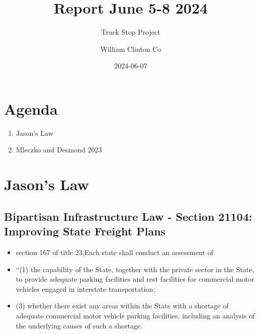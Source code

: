 \documentclass[
  letterpaper,
  DIV=11,
  numbers=noendperiod]{scrartcl}
\title{Report June 5-8 2024}
\subtitle{Truck Stop Project}
\author{William Clinton Co}
\date{2024-06-07}
\begin{document}
\maketitle
\ifdefined\Shaded\renewenvironment{Shaded}{\begin{tcolorbox}[sharp corners, interior hidden, enhanced, frame hidden, borderline west={3pt}{0pt}{shadecolor}, boxrule=0pt, breakable]}{\end{tcolorbox}}\fi

\hypertarget{agenda}{%
\section{Agenda}\label{agenda}}

\begin{enumerate}
\def\labelenumi{\arabic{enumi}.}
\item
  Jason's Law
\item
  Mleczko and Desmond 2023
\end{enumerate}

\hypertarget{jasons-law}{%
\section{Jason's Law}\label{jasons-law}}

\hypertarget{bipartisan-infrastructure-law---section-21104-improving-state-freight-plans}{%
\subsection{\texorpdfstring{\textbf{Bipartisan Infrastructure Law -
Section 21104: Improving State Freight
Plans}}{Bipartisan Infrastructure Law - Section 21104: Improving State Freight Plans}}\label{bipartisan-infrastructure-law---section-21104-improving-state-freight-plans}}

\begin{itemize}
\item
  section 167 of title 23,Each state shall conduct an assessment of
\item
  ``(1) the capability of the State, together with the private sector in
  the State, to provide adequate parking facilities and rest facilities
  for commercial motor vehicles engaged in interstate transportation;
\item
  (3) whether there exist any areas within the State with a shortage of
  adequate commercial motor vehicle parking facilities, including an
  analysis of the underlying causes of such a shortage.
\end{itemize}
\end{document}
